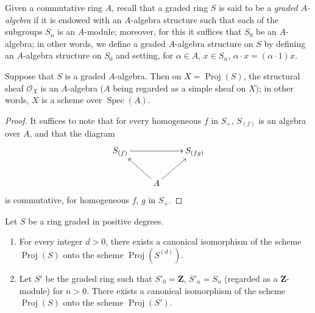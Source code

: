 \begin{env}[2.4.5]
\label{II.2.4.5}
Given a commutative ring $A$, recall that a graded ring $S$ is said to be
a \emph{graded $A$-algebra} if it is endowed with an $A$-algebra structure
such that each of the subgroups $S_n$ is an $A$-module;
moreover, for this it suffices that $S_0$ be
an $A$-algebra; in other words, we define a graded $A$-algebra structure on
$S$ by defining an $A$-algebra structure on $S_0$
and setting, for $\alpha\in A$, $x\in S_n$,
$\alpha\cdot x=(\alpha\cdot1)x$.
\end{env}

\begin{proposition}[2.4.6]
\label{II.2.4.6}
Suppose that $S$ is a graded $A$-algebra. Then on
$X=\operatorname{Proj}(S)$, the structural sheaf $\mathcal{O}_X$ is an
$A$-algebra ($A$ being regarded as a simple sheaf on $X$); in
other words, $X$ is a scheme over $\operatorname{Spec}(A)$.
\end{proposition}

\begin{proof}
It suffices to note that for every homogeneous $f$ in $S_+$, $S_{(f)}$ is
an algebra over $A$, and that the diagram
\[
  \xymatrix{
    S_{(f)}\ar[rr] && S_{(fg)}\\
    & A\ar[ul]\ar[ur] &
  }
\]
is commutative, for homogeneous $f$, $g$ in $S_+$.
\end{proof}

\begin{proposition}[2.4.7]
\label{II.2.4.7}
Let $S$ be a ring graded in positive degrees.
\begin{enumerate}
  \item[\rm(i)] For every integer $d>0$, there exists a canonical isomorphism
    of the scheme $\operatorname{Proj}(S)$ onto the scheme
    $\operatorname{Proj}(S^{(d)})$.
  \item[\rm(ii)] Let $S'$ be the graded ring such that $S'_0=\mathbf{Z}$,
    $S'_n=S_n$ (regarded as a $\mathbf{Z}$-module) for $n>0$. There exists
    a canonical isomorphism of the scheme $\operatorname{Proj}(S)$ onto the
    scheme $\operatorname{Proj}(S')$.
\end{enumerate}
\end{proposition}

